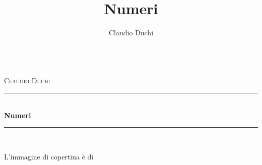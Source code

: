 \documentclass{book}%
\title{Numeri}
\author{Claudio Duchi}
\date{\datetime}
\makeatletter
\newcommand{\HRule}{\rule{\linewidth}{0.5mm}}
\renewcommand\frontmatter{%
	\cleardoublepage
	\@mainmatterfalse
}
\renewcommand\mainmatter{%
	\cleardoublepage
	\@mainmattertrue
}
\theoremstyle{definition}
\theoremstyle{plain}
\makeatother
\begin{document}
		\frontmatter
		\hypersetup{pageanchor=false}
		\begin{titlepage}
			\begin{center}
			\\[1cm]
				\textsc{\LARGE Claudio Duchi}\\[1.5cm]
				\HRule \\[0.4cm]
				{ \huge \bfseries Numeri}\\[0.4cm]
				\HRule \\[1.5cm]
	
		\end{center}
		\end{titlepage}
	\hypersetup{pageanchor=true}
	L'immagine di copertina è di \cite{PatrickT2014}\par
		
		\tableofcontents
		\mainmatter
	 
\cleardoublepage	
\begin{appendices}
	

	\glsaddall
	\twocolumn
	\printglossaries
	\onecolumn
\end{appendices}
\cleardoublepage
\nocite{*}
\printbibliography
\cleardoublepage
{}

\printindex
\end{document}

